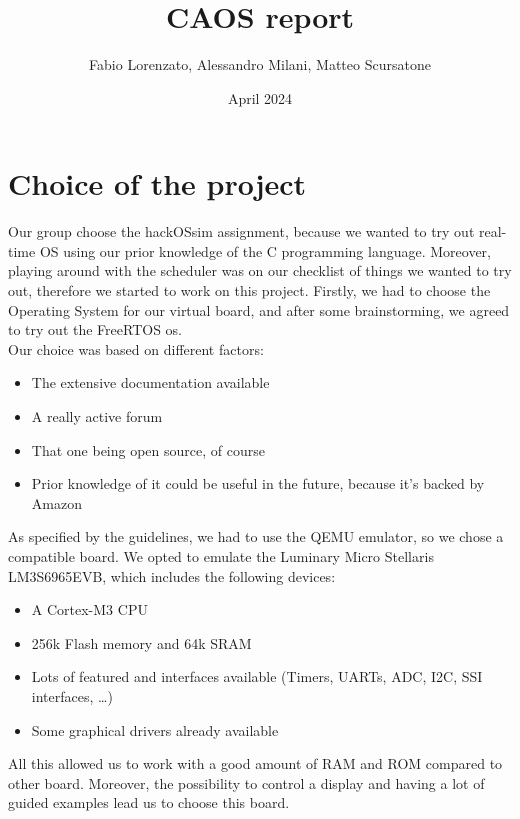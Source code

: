 \documentclass{article}
\title{CAOS report}
\author{Fabio Lorenzato, Alessandro Milani, Matteo Scursatone}
\date{April 2024}
\begin{document}
\maketitle
\tableofcontents

\section*{Choice of the project}
Our group choose the hackOSsim assignment, because we wanted  to try out real-time OS using our prior knowledge of the C programming language. Moreover, playing around with the scheduler was on our checklist of things we wanted to try out, therefore we started to work on this project.
Firstly, we had to choose the Operating System for our virtual board, and after some brainstorming, we agreed to try out the FreeRTOS os.\\
Our choice was based on different factors:
\begin{itemize}
    \item The extensive documentation available
    \item A really active forum
    \item That one being open source, of course
    \item Prior knowledge of it could be useful in the future, because it's backed by Amazon
\end{itemize}

As specified by the guidelines, we had to use the QEMU emulator, so we chose a compatible board. We opted to emulate the Luminary Micro Stellaris LM3S6965EVB, which includes the following devices:
\begin{itemize}
    \item A Cortex-M3 CPU 
    \item 256k Flash memory and 64k SRAM
    \item Lots of featured and interfaces available (Timers, UARTs, ADC, I2C, SSI interfaces, \dots)
    \item Some graphical drivers already available
\end{itemize}

All this allowed us to work with a good amount of RAM and ROM compared to other board. Moreover, the possibility to control a display and having a lot of guided examples lead us to choose this board.
\newpage
\end{document}
